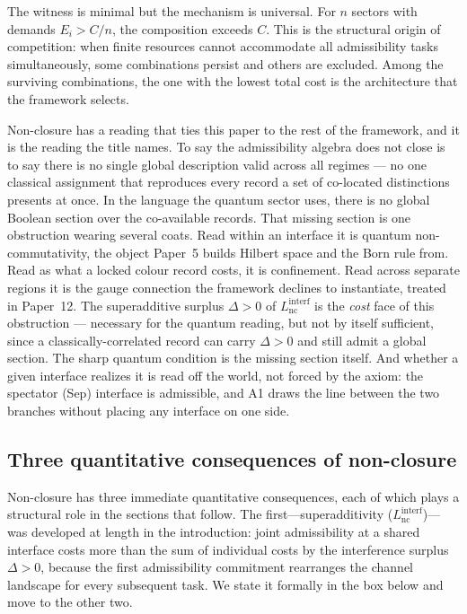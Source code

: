 \documentclass[11pt]{article}
\begin{document}
The witness is minimal but the mechanism is universal.  For $n$ sectors with demands $E_i > C/n$, the composition exceeds $C$.  This is the structural origin of competition: when finite resources cannot accommodate all admissibility tasks simultaneously, some combinations persist and others are excluded.  Among the surviving combinations, the one with the lowest total cost is the architecture that the framework selects.

Non-closure has a reading that ties this paper to the rest of the framework, and it is the reading the title names.  To say the admissibility algebra does not close is to say there is no single global description valid across all regimes --- no one classical assignment that reproduces every record a set of co-located distinctions presents at once.  In the language the quantum sector uses, there is no global Boolean section over the co-available records.  That missing section is one obstruction wearing several coats.  Read within an interface it is quantum non-commutativity, the object Paper~5 builds Hilbert space and the Born rule from.  Read as what a locked colour record costs, it is confinement.  Read across separate regions it is the gauge connection the framework declines to instantiate, treated in Paper~12.  The superadditive surplus $\Delta>0$ of $L_{\mathrm{nc}}^{\mathrm{interf}}$ is the \emph{cost} face of this obstruction --- necessary for the quantum reading, but not by itself sufficient, since a classically-correlated record can carry $\Delta>0$ and still admit a global section.  The sharp quantum condition is the missing section itself.  And whether a given interface realizes it is read off the world, not forced by the axiom: the spectator (Sep) interface is admissible, and A1 draws the line between the two branches without placing any interface on one side.

\subsection{Three quantitative consequences of non-closure}

Non-closure has three immediate quantitative consequences, each of which plays a structural role in the sections that follow.  The first---superadditivity ($L_{\mathrm{nc}}^{\mathrm{interf}}$)---was developed at length in the introduction: joint admissibility at a shared interface costs more than the sum of individual costs by the interference surplus $\Delta > 0$, because the first admissibility commitment rearranges the channel landscape for every subsequent task.  We state it formally in the box below and move to the other two.
\end{document}
